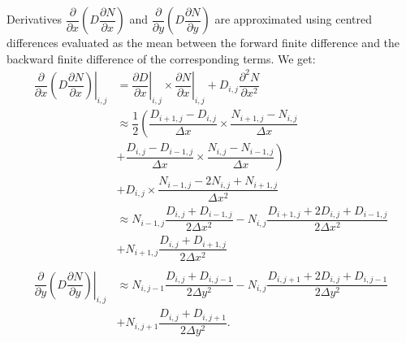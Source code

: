 \noindent Derivatives
$\dfrac{\partial}{\partial x} \left( D\dfrac{\partial N}{\partial x} \right)$ and
$ \dfrac{\partial}{\partial y} \left( D\dfrac{\partial N}{\partial y} \right)$ are approximated using centred differences evaluated 
as the mean between the forward finite difference and the backward finite difference of the corresponding terms. We get:
\begin{align}
  \left.\dfrac{\partial}{\partial x}\left( D\dfrac{\partial N}{\partial x}\right)\right|_{i,j} 
  &=\left.\dfrac{\partial D}{\partial x}\right|_{i,j} \times \left.\dfrac{\partial N}{\partial x}\right|_{i,j} 
  + D_{i,j}\dfrac{\partial^2 N}{\partial x^2}\\
  &\approx \dfrac{1}{2}\left(
    \dfrac{D_{i+1,j}-D_{i,j}}{\Delta x}\times \dfrac{N_{i+1,j}-N_{i,j}}{\Delta x}\right. \nonumber \\
  &  + \left.\dfrac{D_{i,j}-D_{i-1,j}}{\Delta x}\times \dfrac{N_{i,j}-N_{i-1,j}}{\Delta x}\right) \nonumber\\
  &  + D_{i,j}\times\dfrac{N_{i-1,j}-2N_{i,j}+N_{i+1,j}}{\Delta x^2}\\
  &\approx
  N_{i-1,j}\dfrac{D_{i,j}+D_{i-1,j}}{2\Delta x^2}
  -N_{i,j}\dfrac{D_{i+1,j}+2D_{i,j}+D_{i-1,j}}{2\Delta x^2} \nonumber\\
  \label{eq:diffusion-x}
  &+  N_{i+1,j}\dfrac{D_{i,j}+D_{i+1,j}}{2\Delta x^2} 
  \\\nonumber\\
  \nonumber
  \left.\dfrac{\partial}{\partial y}\left(
      D\dfrac{\partial N}{\partial y}\right)\right|_{i,j}
  &\approx
  N_{i,j-1}\dfrac{D_{i,j}+D_{i,j-1}}{2\Delta y^2}
  - N_{i,j}\dfrac{D_{i,j+1}+2D_{i,j}+D_{i,j-1}}{2\Delta y^2}
  \\\label{eq:diffusion-y}
  &+ N_{i,j+1}\dfrac{D_{i,j}+D_{i,j+1}}{2\Delta y^2}.
\end{align}


